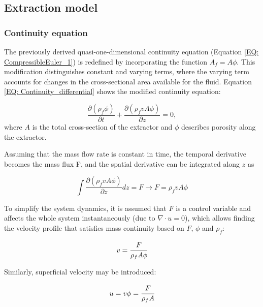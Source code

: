 \documentclass[a4paper,fleqn]{cas-dc}
\begin{document}
	\subsection{Extraction model} \label{CH: Extraction_model}
	\subsubsection{Continuity equation} \label{CH: Continuity}
	
	The previously derived quasi-one-dimensional continuity equation (Equation \ref{EQ: CompressibleEuler_1}) is redefined by incorporating the function $A_f = A\phi$. This modification distinguishes constant and varying terms, where the varying term accounts for changes in the cross-sectional area available for the fluid. Equation \ref{EQ: Continuity_differential} shows the modified continuity equation:
	
	{\footnotesize
		\begin{equation} \label{EQ: Continuity_differential}
			\frac{\partial (\rho_f \phi)}{\partial t} + \frac{\partial (\rho_f v A\phi)}{\partial z} = 0,
		\end{equation}
	}
	where $A$ is the total cross-section of the extractor and $\phi$ describes porosity along the extractor.
	
	Assuming that the mass flow rate is constant in time, the temporal derivative becomes the mass flux F, and the spatial derivative can be integrated along $z$ as
	
	{\footnotesize
		\begin{equation}
			\int \frac{\partial (\rho_f v A \phi )}{\partial z} dz = F \rightarrow F=\rho_f v A\phi
		\end{equation}
	}
	
	To simplify the system dynamics, it is assumed that $F$ is a control variable and affects the whole system instantaneously (due to $\nabla \cdot u = 0$), which allows finding the velocity profile that satisfies mass continuity based on $F$, $\phi$ and $\rho_f$:
	
	{\footnotesize
		\begin{equation} \label{EQ:Velocity_1}
			v = \cfrac{F}{\rho_f A\phi} 
		\end{equation}
	}
	
	Similarly, superficial velocity may be introduced:
	
	{\footnotesize
		\begin{equation} \label{EQ:Velocity_2}
			u = v \phi = \cfrac{F}{\rho_f A }
		\end{equation}
	}
	
\end{document}
